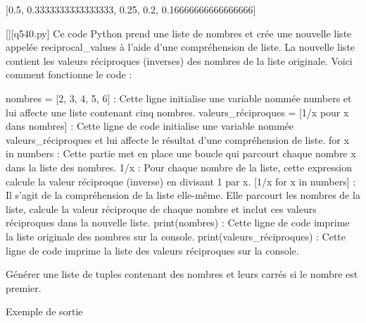 [0.5, 0.3333333333333333, 0.25, 0.2, 0.16666666666666666]
        \par
        \begin{solution}
            \renewcommand{\nomfichier}{q540.py}
            \pythonfile{\chemincode \nomfichier}[][\nomfichier]
            Ce code Python prend une liste de nombres et crée une nouvelle liste appelée reciprocal\_values à l'aide d'une compréhension de liste. La nouvelle liste contient les valeurs réciproques (inverses) des nombres de la liste originale. Voici comment fonctionne le code :

    nombres = [2, 3, 4, 5, 6] : Cette ligne initialise une variable nommée numbers et lui affecte une liste contenant cinq nombres.
    valeurs\_réciproques = [1/x pour x dans nombres] : Cette ligne de code initialise une variable nommée valeurs\_réciproques et lui affecte le résultat d'une compréhension de liste.
        for x in numbers : Cette partie met en place une boucle qui parcourt chaque nombre x dans la liste des nombres.
        1/x : Pour chaque nombre de la liste, cette expression calcule la valeur réciproque (inverse) en divisant 1 par x.
        [1/x for x in numbers] : Il s'agit de la compréhension de la liste elle-même. Elle parcourt les nombres de la liste, calcule la valeur réciproque de chaque nombre et inclut ces valeurs réciproques dans la nouvelle liste.
    print(nombres) : Cette ligne de code imprime la liste originale des nombres sur la console.
    print(valeurs\_réciproques) : Cette ligne de code imprime la liste des valeurs réciproques sur la console.
        \end{solution}
        

        \question
        Générer une liste de tuples contenant des nombres et leurs carrés si le nombre est premier.

Exemple de sortie

